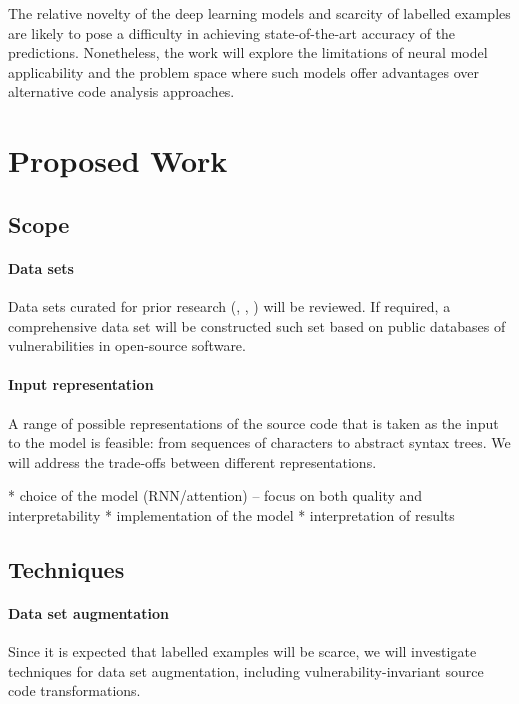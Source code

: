 \documentclass[twoside,a4paper]{scrartcl}
\begin{document}
The relative novelty of the deep learning models and scarcity of labelled
examples are likely to pose a difficulty in achieving state-of-the-art accuracy of
the predictions. Nonetheless, the work will explore the limitations of
neural model applicability and the problem space where such models offer advantages
over alternative code analysis approaches.

\section{Proposed Work}

\subsection{Scope}

\paragraph{Data sets} Data sets curated for prior research (\cite{li2016vulpecker}, 
\cite{perl2015vccfinder}, \cite{meneely2013patch})
will be reviewed. If required, a comprehensive data set will be constructed
such set based on public databases of vulnerabilities in open-source software. 

\paragraph{Input representation} A range of possible representations of the source
code that is taken as the input to the model is feasible: from sequences of 
characters to abstract syntax trees. We will address the trade-offs between different
representations.

* choice of the model (RNN/attention) -- focus on both quality and interpretability
* implementation of the model
* interpretation of results

\subsection{Techniques}

\paragraph{Data set augmentation} Since it is expected that labelled examples will 
be scarce, we will investigate techniques for data set augmentation, including 
vulnerability-invariant source code transformations. 
\end{document}
